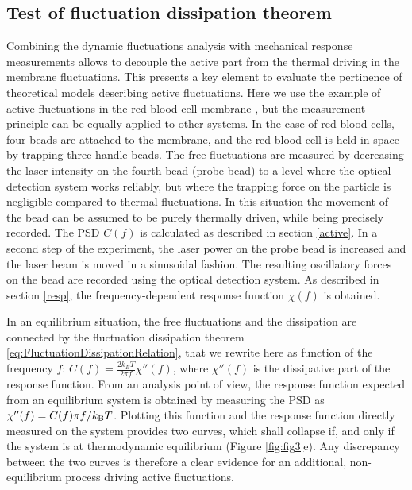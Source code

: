 \documentclass[graybox]{svmult}
\begin{document}
\subsection{Test of fluctuation dissipation theorem}
	\label{FDT}
Combining the dynamic fluctuations analysis with mechanical response measurements allows to decouple the active part from the thermal driving in the membrane fluctuations. This presents a key element to evaluate the pertinence of theoretical models describing active fluctuations. Here we use the example of active fluctuations in the red blood cell membrane \cite{Turlier:2016}, but the measurement principle can be equally applied to other systems. In the case of red blood cells, four beads are attached to the membrane, and the red blood cell is held in space by trapping three handle beads. The free fluctuations are measured by decreasing the laser intensity on the fourth bead (probe bead) to a level where the optical detection system works reliably, but where the trapping force on the particle is negligible compared to thermal fluctuations. In this situation the movement of the bead can be assumed to be purely thermally driven, while being precisely recorded. The PSD $C(f)$ is calculated as described in section \ref{active}. In a second step of the experiment, the laser power on the probe bead is increased and the laser beam is moved in a sinusoidal fashion. The resulting oscillatory forces on the bead are recorded using the optical detection system. As described in section \ref{resp}, the frequency-dependent response function $\chi(f)$ is obtained. 

In an equilibrium situation, the free fluctuations and the dissipation are connected by the fluctuation dissipation theorem \eqref{eq:FluctuationDissipationRelation}, that we rewrite here as function of the frequency $f$: $C(f)=\frac{2 k_B T}{2\pi f} \chi''(f)$, where $\chi''(f)$ is the dissipative part of the response function. From an analysis point of view, the response function expected from an equilibrium system is obtained by measuring the PSD as $\chi''(f)= C(f) \pi f/k_{\rm{B}} T$. Plotting this function and the response function directly measured on the system provides two curves, which shall collapse if, and only if the system is at thermodynamic equilibrium (Figure \ref{fig:fig3}e). Any discrepancy between the two curves is therefore a clear evidence for an additional, non-equilibrium process driving active fluctuations. 
\end{document}

